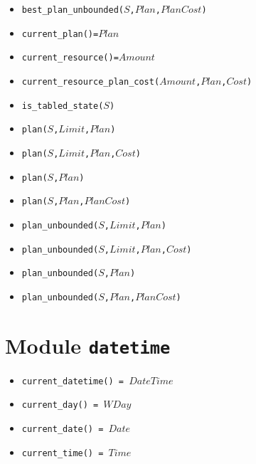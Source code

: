 \documentclass[10pt]{article}
\newcommand{\ignore}[1]{}
\begin{document}
\begin{multicols}{2}
\begin{scriptsize}
\begin{itemize}
\item \texttt{best\_plan\_unbounded($S$,$Plan$,$PlanCost$)}
\item \texttt{current\_plan()=$Plan$}
\item \texttt{current\_resource()=$Amount$}
\item \texttt{current\_resource\_plan\_cost($Amount$,$Plan$,$Cost$)}
\item \texttt{is\_tabled\_state($S$)}
\item \texttt{plan($S$,$Limit$,$Plan$)}
\item \texttt{plan($S$,$Limit$,$Plan$,$Cost$)}
\item \texttt{plan($S$,$Plan$)}
\item \texttt{plan($S$,$Plan$,$PlanCost$)}
\item \texttt{plan\_unbounded($S$,$Limit$,$Plan$)}
\item \texttt{plan\_unbounded($S$,$Limit$,$Plan$,$Cost$)}
\item \texttt{plan\_unbounded($S$,$Plan$)}
\item \texttt{plan\_unbounded($S$,$Plan$,$PlanCost$)}
\end{itemize}
\end{scriptsize}

\section*{Module \texttt{datetime}}  
\begin{scriptsize}
\begin{itemize}
\item \texttt{current\_datetime() = $DateTime$}
\item \texttt{current\_day() = $WDay$}
\item \texttt{current\_date() = $Date$}
\item \texttt{current\_time() = $Time$}
\end{itemize}
\end{scriptsize}

\ignore{
}
\end{multicols}
\end{document}

